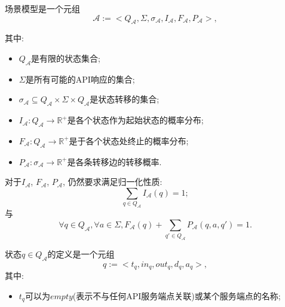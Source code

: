             \begin{definition}
                \label{def:our}
                场景模型是一个元组
                \begin{equation}
                     \mathcal{A} := <Q_{\mathcal{A}}, \Sigma, \sigma_{\mathcal{A}}, I_{\mathcal{A}}, F_{\mathcal{A}}, P_{\mathcal{A}}>,
                \end{equation}
                
                其中:
                \begin{itemize}
                    \item $Q_{\mathcal{A}}$是有限的状态集合;
                    
                    \item $\Sigma$是所有可能的API响应的集合;
                    
                    \item $\sigma_{\mathcal{A}} \subseteq Q_{\mathcal{A}} \times \Sigma \times Q_{\mathcal{A}}$是状态转移的集合;
                    
                    \item $I_{\mathcal{A}} : Q_{\mathcal{A}} \to \mathbb{R}^{+}$是各个状态作为起始状态的概率分布;
                    
                    \item $F_{\mathcal{A}} : Q_{\mathcal{A}} \to \mathbb{R}^{+}$是于各个状态处终止的概率分布;
                    
                    \item $P_{\mathcal{A}}: \sigma_{\mathcal{A}} \to \mathbb{R}^{+}$是各条转移边的转移概率.
                \end{itemize}
                
                对于$I_{\mathcal{A}}$, $F_{\mathcal{A}}$, $P_{\mathcal{A}}$, 仍然要求满足归一化性质:
                \begin{equation}
                    \sum_{q \in Q_{\mathcal{A}}} I_{\mathcal{A}}(q) = 1;
                \end{equation}
                与
                \begin{equation}
                    \forall q \in Q_{\mathcal{A}}, \forall a \in \Sigma, F_{\mathcal{A}}(q) + \sum_{q' \in Q_{\mathcal{A}}} P_{\mathcal{A}}(q,a,q') = 1.
                \end{equation}
                
                状态$q \in Q_{\mathcal{A}}$的定义是一个元组
                \begin{equation}
                    q := <t_q, in_q, out_q, d_q, a_q>,
                \end{equation}
                其中:
                \begin{itemize}
                    \item $t_q$可以为$empty$(表示不与任何API服务端点关联)或某个服务端点的名称;
                    

\end{itemize}
\end{definition}
